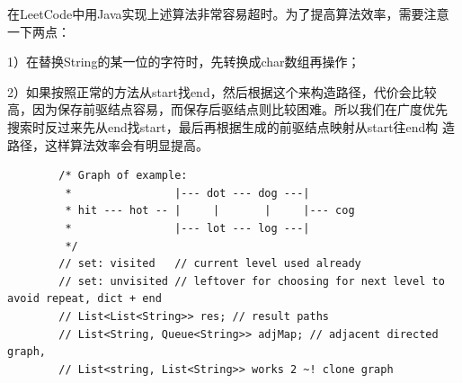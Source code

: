 \documentclass[12pt]{book}
\begin{document}
在LeetCode中用Java实现上述算法非常容易超时。为了提高算法效率，需要注意一下两点：

1）在替换String的某一位的字符时，先转换成char数组再操作；

2）如果按照正常的方法从start找end，然后根据这个来构造路径，代价会比较
高，因为保存前驱结点容易，而保存后驱结点则比较困难。所以我们在广度优先
搜索时反过来先从end找start，最后再根据生成的前驱结点映射从start往end构
造路径，这样算法效率会有明显提高。

\lstset{language=java,label= ,caption= ,numbers=none}
\begin{lstlisting}
        /* Graph of example:
         *                |--- dot --- dog ---|
         * hit --- hot -- |     |       |     |--- cog
         *                |--- lot --- log ---|
         */
        // set: visited   // current level used already
        // set: unvisited // leftover for choosing for next level to avoid repeat, dict + end
        // List<List<String>> res; // result paths
        // List<String, Queue<String>> adjMap; // adjacent directed graph, 
        // List<string, List<String>> works 2 ~! clone graph
\end{lstlisting}
\end{document}
